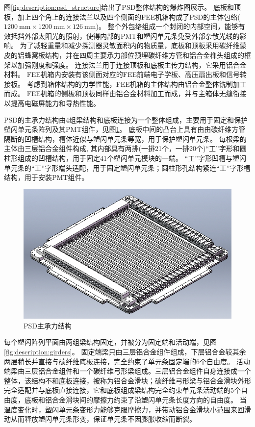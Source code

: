 图\ref*{fig:description:psd_structure}给出了PSD整体结构的爆炸图展示。
底板和顶板，加上四个角上的连接法兰以及四个侧面的FEE机箱构成了PSD的主体包络($\SI{1200}{\milli\meter}\times\SI{1200}{\milli\meter}\times\SI{126}{\milli\meter}$)。
整个外包络组成一个封闭的内部空间，能够有效抵挡外部太阳光的照射，使得内部的PMT和塑闪单元条免受外部杂散光线的影响。
为了减轻重量和减少探测器灵敏面积内的物质量，底板和顶板采用碳纤维蒙皮的铝蜂窝板结构，并在四周主要承力部位预埋碳纤维方管和铝合金榫头组成的框架以加强刚度和强度。
连接法兰用于连接顶板和底板主传力结构，它采用铝合金材料。
FEE机箱内安装有该侧面对应的FEE前端电子学板、高压扇出板和信号转接板。
考虑到箱体结构的力学性能，FEE机箱的主体结构由铝合金整体铣制加工而成。
FEE机箱的侧板和顶板同样由铝合金材料加工而成，并与主箱体无缝衔接以提高电磁屏能力和导热性能。

PSD的主承力结构由4组梁结构和底板连接为一个整体组成，主要用于固定和保护塑闪单元条阵列及其PMT组件，见图\ref{fig:description:bottom_plate}。
底板中间的凸台上具有由由碳纤维方管隔断的凹槽结构，槽体近似与塑闪单元条等宽，用于保护塑闪单元条。
每根梁的主体由三层铝合金组件构成, 其内部具有两排(一排21个，一排20个)“工”字形和圆柱形组成的凹槽结构，用于固定41个塑闪单元模块的一端。
“工”字形凹槽与塑闪单元条的“工”字形端头适配，用于固定塑闪单元条；圆柱形孔结构紧连“工”字形槽结构，用于安装PMT组件。

\begin{figure}[h!]
\centering
\includegraphics[width=0.7\linewidth]{chap/description/fig/bottom_plate}
\caption{PSD主承力结构}
\label{fig:description:bottom_plate}
\end{figure}

每个塑闪阵列平面由两组梁结构固定，并被分为固定端和活动端，见图\ref{fig:description:girders}。
固定端梁只由三层铝合金组件组成，下层铝合金较其余两层稍长并直接与碳纤维底板连接，完全约束了单元条固定端的6个自由度。
活动端梁由三层铝合金组件和一个碳纤维弓形梁组成。三层铝合金组件自身连接成一个整体，该结构不和底板连接，被称为铝合金滑块；碳纤维弓形梁与铝合金滑块外形完全适配并与底板直接连接，它和底板组成梁结构完全约束单元条活动端的5个自由度，底板和铝合金滑块间的摩擦力约束了沿塑闪单元条长度方向的自由度。
当温度变化时，塑闪单元条变形力能够克服摩擦力，并带动铝合金滑块小范围来回滑动从而释放塑闪单元条形变，保证单元条不因膨胀收缩而断裂。

